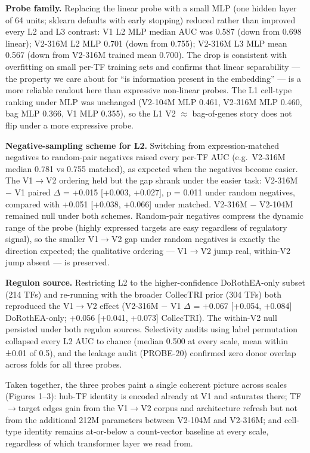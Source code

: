 \documentclass[10pt]{article}
\begin{document}
\textbf{Probe family.} Replacing the linear probe with a small MLP (one
hidden layer of 64 units; sklearn defaults with early stopping) reduced rather than improved every
L2 and L3 contrast: V1 L2 MLP median AUC was 0.587 (down from 0.698
linear); V2-316M L2 MLP 0.701 (down from 0.755); V2-316M L3 MLP mean 0.567
(down from V2-316M trained mean 0.700). The drop is consistent with overfitting on small
per-TF training sets and confirms that linear separability --- the
property we care about for ``is information present in the embedding''
--- is a more reliable readout here than expressive non-linear probes.
The L1 cell-type ranking under MLP was unchanged (V2-104M MLP 0.461,
V2-316M MLP 0.460, bag MLP 0.366, V1 MLP 0.355), so the L1 V2 $\approx$
bag-of-genes story does not flip under a more expressive probe.

\textbf{Negative-sampling scheme for L2.} Switching from expression-matched
negatives to random-pair negatives raised every per-TF AUC (e.g.~V2-316M
median 0.781 vs 0.755 matched), as expected when the negatives become
easier. The V1$\to$V2 ordering held but the gap shrank under the easier
task: V2-316M $-$ V1 paired $\Delta$ = +0.015 {[}+0.003, +0.027{]}, p = 0.011 under random
negatives, compared with +0.051 {[}+0.038, +0.066{]} under matched. V2-316M $-$
V2-104M remained null under both schemes. Random-pair negatives compress the dynamic range of the probe (highly expressed targets are easy regardless of regulatory signal), so the smaller V1$\to$V2 gap under random negatives is exactly the direction expected; the qualitative ordering --- V1$\to$V2 jump real, within-V2 jump absent --- is preserved.

\textbf{Regulon source.} Restricting L2 to the higher-confidence
DoRothEA-only subset (214 TFs) and re-running with the broader CollecTRI
prior (304 TFs) both reproduced the V1$\to$V2 effect (V2-316M $-$ V1 $\Delta$ =
+0.067 {[}+0.054, +0.084{]} DoRothEA-only; +0.056 {[}+0.041, +0.073{]}
CollecTRI). The within-V2 null persisted under both regulon sources.
Selectivity audits using label permutation collapsed every L2 AUC to
chance (median 0.500 at every scale, mean within ±0.01 of 0.5), and the
leakage audit (PROBE-20) confirmed zero donor overlap across folds for
all three probes.

Taken together, the three probes paint a single coherent picture across
scales (Figures 1--3): hub-TF identity is encoded already at V1 and
saturates there; TF$\to$target edges gain from the V1$\to$V2 corpus and
architecture refresh but not from the additional 212M parameters between
V2-104M and V2-316M; and cell-type identity remains at-or-below a
count-vector baseline at every scale, regardless of which transformer
layer we read from.
\end{document}
